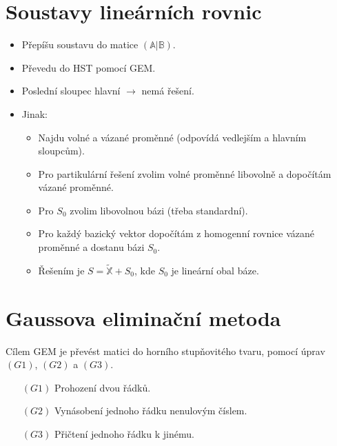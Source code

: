 \documentclass{szzclass}
\begin{document}
\section{Soustavy lineárních rovnic}
\begin{itemize}
\item Přepíšu soustavu do matice $(\mathbb{A}|\mathbb{B})$.
\item Převedu do HST pomocí GEM.
\item Poslední sloupec hlavní $\rightarrow$ nemá řešení.
\item Jinak:
  \begin{itemize}
  \item Najdu volné a vázané proměnné (odpovídá vedlejším a hlavním sloupcům).
  \item Pro partikulární řešení zvolim volné proměnné libovolně a dopočítám vázané proměnné.
  \item Pro $S_0$ zvolim libovolnou bázi (třeba standardní).
  \item Pro každý bazický vektor dopočítám z homogenní rovnice vázané proměnné a dostanu bázi $S_0$.
  \item Řešením je $S=\widetilde{\mathbb{X}}+S_0$, kde $S_0$ je lineární obal báze.
  \end{itemize}
\end{itemize}

\section{Gaussova eliminační metoda}
Cílem GEM je převést matici do horního stupňovitého tvaru, pomocí úprav $(G1)$, $(G2)$ a $(G3)$.

\begin{itemize}
\item[$(G1)$] Prohození dvou řádků.
\item[$(G2)$] Vynásobení jednoho řádku nenulovým číslem.
\item[$(G3)$] Přičtení jednoho řádku k jinému.
\end{itemize}
\end{document}
